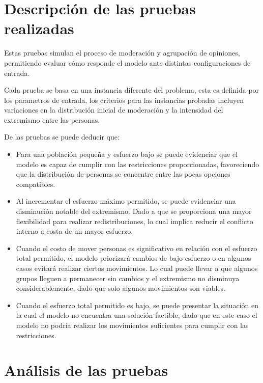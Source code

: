 \documentclass[11pt,letter]{article}
\begin{document}
\section{Descripción de las pruebas realizadas}
Estas pruebas simulan el proceso de moderación y agrupación de opiniones, permitiendo evaluar cómo responde el modelo ante distintas configuraciones de entrada.

Cada prueba se basa en una instancia diferente del problema, esta es definida por los parametros de entrada, los criterios para las instancias probadas incluyen variaciones en la distribución inicial de moderación y la intensidad del extremismo entre las personas.

De las pruebas se puede deducir que:
\begin{itemize}
    \item Para una población pequeña y esfuerzo bajo se puede evidenciar que el modelo es capaz de cumplir con las restricciones proporcionadas, favoreciendo que la distribución de personas se concentre entre las pocas opciones compatibles.

    \item Al incrementar el esfuerzo máximo permitido, se puede evidenciar una disminución notable del extremismo. Dado a que se proporciona una mayor flexibilidad para realizar redistribuciones, lo cual implica reducir el conflicto interno a costa de un mayor esfuerzo.

    \item Cuando el costo de mover personas es significativo en relación con el esfuerzo total permitido, el modelo priorizará cambios de bajo esfuerzo o en algunos casos evitará realizar ciertos movimientos. Lo cual puede llevar a que algunos grupos lleguen a permanecer sin cambios y el extremismo no disminuya considerablemente, dado que solo algunos movimientos son viables.

    \item Cuando el esfuerzo total permitido es bajo, se puede presentar la situación en la cual el modelo no encuentra una solución factible, dado que en este caso el modelo no podría realizar los movimientos suficientes para cumplir con las restricciones.


\end{itemize}



\section{Análisis de las pruebas}
\end{document}

